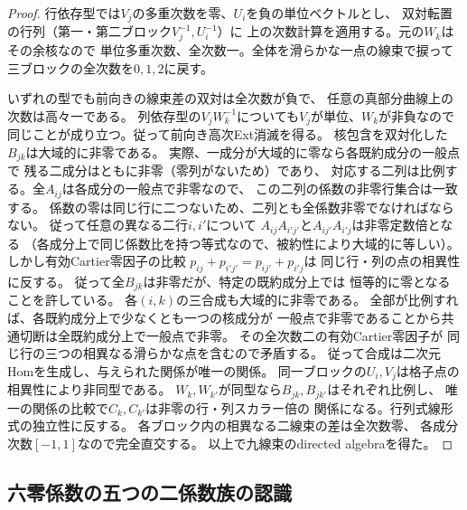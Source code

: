 \begin{proof}
行依存型では$V_j$の多重次数を零、$U_i$を負の単位ベクトルとし、
双対転置の行列（第一・第二ブロック$V_j^{-1},U_i^{-1}$）に
上の次数計算を適用する。元の$W_k$はその余核なので
単位多重次数、全次数一。全体を滑らかな一点の線束で捩って
三ブロックの全次数を$0,1,2$に戻す。

いずれの型でも前向きの線束差の双対は全次数が負で、
任意の真部分曲線上の次数は高々一である。
列依存型の$V_jW_k^{-1}$についても$V_j$が単位、$W_k$が非負なので
同じことが成り立つ。従って前向き高次Ext消滅を得る。
核包含を双対化した$B_{jk}$は大域的に非零である。
実際、一成分が大域的に零なら各既約成分の一般点で
残る二成分はともに非零（零列がないため）であり、
対応する二列は比例する。全$A_{ij}$は各成分の一般点で非零なので、
この二列の係数の非零行集合は一致する。
係数の零は同じ行に二つないため、二列とも全係数非零でなければならない。
従って任意の異なる二行$i,i'$について
$A_{ij}A_{i'j'}$と$A_{ij'}A_{i'j}$は非零定数倍となる
（各成分上で同じ係数比を持つ等式なので、被約性により大域的に等しい）。
しかし有効Cartier零因子の比較
$p_{ij}+p_{i'j'}=p_{ij'}+p_{i'j}$は
同じ行・列の点の相異性に反する。
従って全$B_{jk}$は非零だが、特定の既約成分上では
恒等的に零となることを許している。
各$(i,k)$の三合成も大域的に非零である。
全部が比例すれば、各既約成分上で少なくとも一つの核成分が
一般点で非零であることから共通切断は全既約成分上で一般点で非零。
その全次数二の有効Cartier零因子が
同じ行の三つの相異なる滑らかな点を含むので矛盾する。
従って合成は二次元Homを生成し、与えられた関係が唯一の関係。
同一ブロックの$U_i,V_j$は格子点の相異性により非同型である。
$W_k,W_{k'}$が同型なら$B_{jk},B_{jk'}$はそれぞれ比例し、
唯一の関係の比較で$C_k,C_{k'}$は非零の行・列スカラー倍の
関係になる。行列式線形式の独立性に反する。
各ブロック内の相異なる二線束の差は全次数零、
各成分次数$[-1,1]$なので完全直交する。
以上で九線束のdirected algebraを得た。
\end{proof}

\subsection{六零係数の五つの二係数族の認識}
\label{subsec:ou-six-zero-curves}

